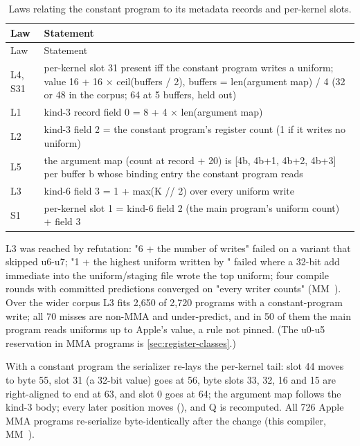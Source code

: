 \begin{xltabular}{\linewidth}{@{}lX@{}}
\caption{Laws relating the constant program to its metadata records and per-kernel slots.}\label{tab:constant-program-laws}\\
\toprule
Law & Statement \\
\midrule
\endfirsthead
{}
\toprule
Law & Statement \\
\midrule
\endhead
L4, S31 & per-kernel slot 31 present iff the constant program writes a uniform;
value 16 + 16 × ceil(buffers / 2), buffers = len(argument map) / 4 (32
or 48 in the corpus; 64 at 5 buffers, held out) \\*
L1 & kind-3 record field 0 = 8 + 4 × len(argument map) \\*
L2 & kind-3 field 2 = the constant program's register count
(1 if it writes no uniform) \\*
L5 & the argument map (count at record + 20) is {[}4b, 4b+1, 4b+2, 4b+3{]}
per buffer b whose binding entry the constant program reads \\*
L3 & kind-6 field 3 = 1 + max(K // 2) over every uniform write \\*
S1 & per-kernel slot 1 = kind-6 field 2 (the main program's
uniform count) + field 3 \\*
\bottomrule
\end{xltabular}

L3 was reached by refutation: "6 + the number of writes" failed on a variant that skipped u6-u7; "1 + the highest
uniform written by " failed where a 32-bit add immediate into the uniform/staging file
wrote the top uniform; four compile rounds with committed predictions converged on "every writer counts" (MM~). Over the wider corpus L3 fits 2,650 of 2,720 programs with a constant-program write;
all 70 misses are non-MMA and under-predict, and in 50 of them the main program reads uniforms up to Apple's value, a
rule not pinned. (The u0-u5 reservation in MMA programs is \cref{sec:register-classes}.)

With a constant program the serializer re-lays the per-kernel tail: slot 44 moves to byte 55, slot 31 (a 32-bit
value) goes at 56, byte slots 33, 32, 16 and 15 are right-aligned to end at 63, and slot 0 goes at 64; the argument map
follows the kind-3 body; every later position moves (), and Q is recomputed. All 726 Apple MMA programs
re-serialize byte-identically after the change (this compiler, MM~).

